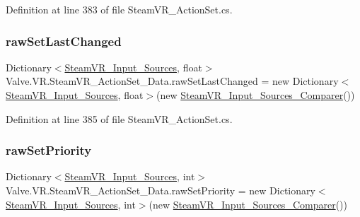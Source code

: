 Definition at line 383 of file Steam\+V\+R\+\_\+\+Action\+Set.\+cs.

\mbox{\label{class_valve_1_1_v_r_1_1_steam_v_r___action_set___data_a86b35b411ada16bc16d9473b617bb19b}} 
\subsubsection{\texorpdfstring{rawSetLastChanged}{rawSetLastChanged}}
{\footnotesize\ttfamily Dictionary$<$\mbox{\hyperlink{namespace_valve_1_1_v_r_a82e5bf501cc3aa155444ee3f0662853f}{Steam\+V\+R\+\_\+\+Input\+\_\+\+Sources}}, float$>$ Valve.\+V\+R.\+Steam\+V\+R\+\_\+\+Action\+Set\+\_\+\+Data.\+raw\+Set\+Last\+Changed = new Dictionary$<$\mbox{\hyperlink{namespace_valve_1_1_v_r_a82e5bf501cc3aa155444ee3f0662853f}{Steam\+V\+R\+\_\+\+Input\+\_\+\+Sources}}, float$>$(new \mbox{\hyperlink{struct_valve_1_1_v_r_1_1_steam_v_r___input___sources___comparer}{Steam\+V\+R\+\_\+\+Input\+\_\+\+Sources\+\_\+\+Comparer}}())\hspace{0.3cm}{\ttfamily [protected]}}



Definition at line 385 of file Steam\+V\+R\+\_\+\+Action\+Set.\+cs.

\mbox{\label{class_valve_1_1_v_r_1_1_steam_v_r___action_set___data_abcd0319e66f185136fb2be11959d4dc0}} 
\subsubsection{\texorpdfstring{rawSetPriority}{rawSetPriority}}
{\footnotesize\ttfamily Dictionary$<$\mbox{\hyperlink{namespace_valve_1_1_v_r_a82e5bf501cc3aa155444ee3f0662853f}{Steam\+V\+R\+\_\+\+Input\+\_\+\+Sources}}, int$>$ Valve.\+V\+R.\+Steam\+V\+R\+\_\+\+Action\+Set\+\_\+\+Data.\+raw\+Set\+Priority = new Dictionary$<$\mbox{\hyperlink{namespace_valve_1_1_v_r_a82e5bf501cc3aa155444ee3f0662853f}{Steam\+V\+R\+\_\+\+Input\+\_\+\+Sources}}, int$>$(new \mbox{\hyperlink{struct_valve_1_1_v_r_1_1_steam_v_r___input___sources___comparer}{Steam\+V\+R\+\_\+\+Input\+\_\+\+Sources\+\_\+\+Comparer}}())\hspace{0.3cm}{\ttfamily [protected]}}




